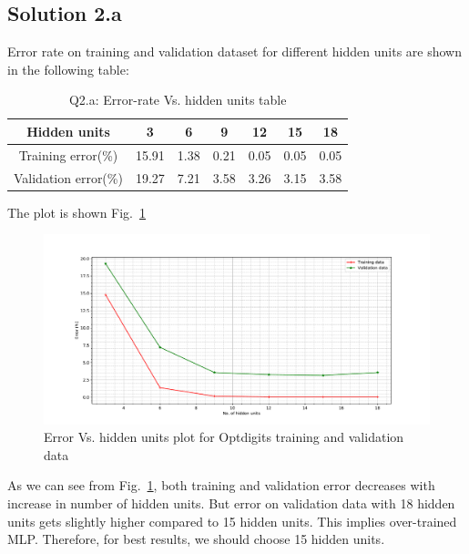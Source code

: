 \subsection*{Solution 2.a}
Error rate on training and validation dataset for different hidden units are shown in the following table:
\begin{table}[h!]
	\begin{center}
		\begin{tabular}{||c | c | c | c | c | c | c ||} 
			\hline
			Hidden units & 3 & 6 & 9 & 12 & 15 & 18 \\ [0.5ex] 
			\hline\hline
			Training error(\%) & 15.91 & 1.38 & 0.21 & 0.05 & 0.05 & 0.05 \\ [0.5ex]
			\hline \hline
			Validation error(\%) & 19.27 & 7.21 & 3.58 & 3.26 & 3.15 & 3.58 \\ [1ex]
			\hline
		\end{tabular}
	\end{center}
	\caption{Q2.a: Error-rate Vs. hidden units table}
\end{table}
The plot is shown Fig.~\ref{fig:tv_error_2a}
\begin{figure}[h!]
	\centering
	\includegraphics[scale=0.5]{2a_tv_error.pdf}
	\caption{Error Vs. hidden units plot for Optdigits training and validation data}
	\label{fig:tv_error_2a}
\end{figure}
\newline
As we can see from Fig.~\ref{fig:tv_error_2a}, both training and validation error decreases with increase in number of hidden units. But error on validation data with 18 hidden units gets slightly higher compared to 15 hidden units. This implies over-trained MLP. Therefore, for best results, we should choose 15 hidden units.

